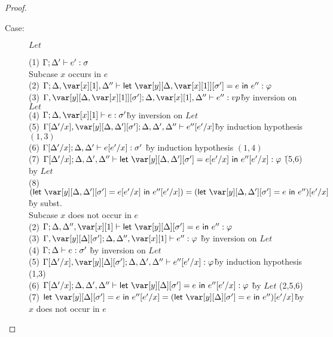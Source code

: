 \begin{proof}
\begin{description}
\item[Case:] $Let$
\begin{tabbing}
  (1) $\Gamma; \Delta' \vdash e' : \sigma$\\
  Subcase $x$ occurs in $e$\\
  (2) $\G; \D, \xl, \D'' \vdash \llet{\y[\D,\xl][\s'] = e}{e''} : \vp$\\
  (3) $\G,\y[\D,\xl][\s']; \D, \xl, \D'' \vdash e'' : vp$\` by inversion on $Let$\\
  (4) $\G; \D, \xl \vdash e : \s'$\` by inversion on $Let$\\
  (5) $\G[\D'/x],\y[\D,\D'][\s']; \D, \D', \D'' \vdash e''[e'/x]$\` by induction hypothesis $(1,3)$\\
  (6) $\Gamma[\Delta'/x]; \Delta, \Delta' \vdash e[e'/x] : \sigma'$ \` by induction hypothesis $(1,4)$\\
  (7) $\G[\D'/x]; \D, \D', \D'' \vdash \llet{\y[\D,\D'][\s'] = e[e'/x]}{e''[e'/x]} : \vp$ \` (5,6) by $Let$\\
  (8) $(\llet{\y[\D,\D'][\s'] = e[e'/x]}{e''[e'/x]}) = (\llet{\y[\D,\D'][\s'] = e}{e''})[e'/x]$ \` by subst.\\
  Subcase $x$ does not occur in $e$\\
  (2) $\G; \D, \D'', \xl  \vdash \llet{\yD = e}{e''} : \vp$\\
  (3) $\G,\yD; \D, \D'', \xl \vdash e'' : \vp$ \` by inversion on $Let$\\
  (4) $\Gamma; \Delta \vdash e : \sigma'$ \` by inversion on $Let$\\
  (5) $\G[\D'/x],\yD; \D, \D', \D'' \vdash e''[e'/x] : \vp$\` by induction hypothesis (1,3)\\
  (6) $\G[\D'/x]; \D, \D', \D'' \vdash \llet{\yD = e}{e''[e'/x]} : \vp$ \` by $Let$ (2,5,6)\\
  (7) $\llet{\yD = e}{e''[e'/x]} = (\llet{\yD = e}{e''})[e'/x]$\` by $x$ does
  not occur in $e$\\
\end{tabbing}


\end{description}
\end{proof}
